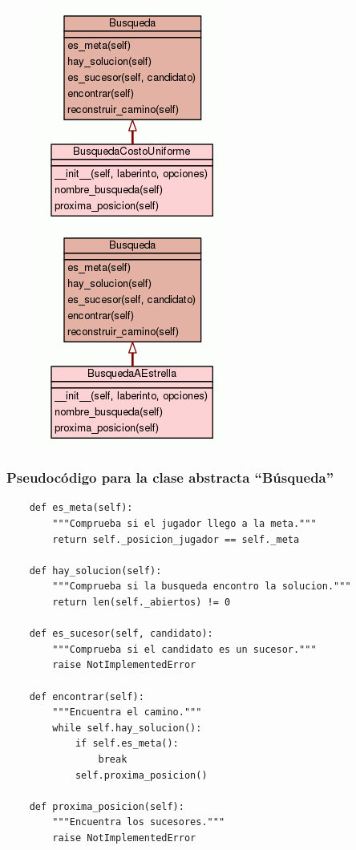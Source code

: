 \documentclass[letter, titlepage, 10pt]{article}
\begin{document}
    \begin{figure}[H]
  \centering
    \begin{minipage}{.5\textwidth}
        \centering
        \includegraphics[width=0.45\linewidth]{images/diagram_bcu}
    \end{minipage}%
    \begin{minipage}{.5\textwidth}
        \centering
        \includegraphics[width=0.45\linewidth]{images/diagram_bae}
    \end{minipage}
\end{figure}


\subsubsection{Pseudocódigo para la clase abstracta ``Búsqueda''}
\begin{lstlisting}
    def es_meta(self):
        """Comprueba si el jugador llego a la meta."""
        return self._posicion_jugador == self._meta

    def hay_solucion(self):
        """Comprueba si la busqueda encontro la solucion."""
        return len(self._abiertos) != 0
    
    def es_sucesor(self, candidato):
        """Comprueba si el candidato es un sucesor."""
        raise NotImplementedError
    
    def encontrar(self):
        """Encuentra el camino."""
        while self.hay_solucion():
            if self.es_meta():
                break
            self.proxima_posicion()
    
    def proxima_posicion(self):
        """Encuentra los sucesores."""
        raise NotImplementedError
\end{lstlisting}
\end{document}

